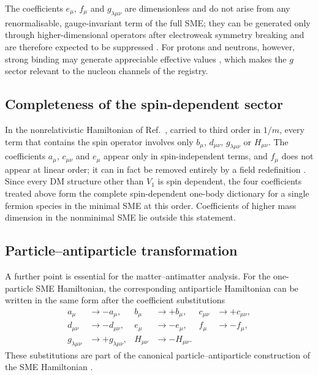 \documentclass[aps,prd,reprint,superscriptaddress,nofootinbib]{revtex4-2}
\begin{document}
The coefficients $e_\mu$, $f_\mu$ and $g_{\lambda\mu\nu}$ are
dimensionless and do not arise from any renormalisable, gauge-invariant
term of the full SME; they can be generated only through
higher-dimensional operators after electroweak symmetry breaking and are
therefore expected to be suppressed \cite{ColladayKostelecky1998}. For
protons and neutrons, however, strong binding may generate appreciable
effective values \cite{KosteleckyLane1999a}, which makes the $g$ sector
relevant to the nucleon channels of the registry.

\subsection{Completeness of the spin-dependent sector}
\label{sec:completeness}

In the nonrelativistic Hamiltonian of Ref.~\cite{KosteleckyLane1999},
carried to third order in $1/m$, every term that contains the spin
operator involves only $b_\mu$, $d_{\mu\nu}$, $g_{\lambda\mu\nu}$ or
$H_{\mu\nu}$. The coefficients $a_\mu$, $c_{\mu\nu}$ and $e_\mu$ appear
only in spin-independent terms, and $f_\mu$ does not appear at linear
order; it can in fact be removed entirely by a field redefinition
\cite{Altschul2006}. Since every DM structure other than $V_1$ is
spin dependent, the four coefficients treated above form the complete
spin-dependent one-body dictionary for a single fermion species in the
minimal SME at this order. Coefficients of higher mass dimension in the
nonminimal SME lie outside this statement.

\subsection{Particle--antiparticle transformation}
	
	A further point is essential for the matter--antimatter analysis.
	For the one-particle SME Hamiltonian, the corresponding antiparticle
	Hamiltonian can be written in the same form after the coefficient
	substitutions
	\begin{equation}
		\begin{aligned}
			a_\mu&\rightarrow -a_\mu,
			&
			b_\mu&\rightarrow +b_\mu,
			&
			c_{\mu\nu}&\rightarrow +c_{\mu\nu},
			\\
			d_{\mu\nu}&\rightarrow -d_{\mu\nu},
			&
			e_\mu&\rightarrow -e_\mu,
			&
			f_\mu&\rightarrow -f_\mu,
			\\
			g_{\lambda\mu\nu}&\rightarrow +g_{\lambda\mu\nu},
			&
			H_{\mu\nu}&\rightarrow -H_{\mu\nu}.
		\end{aligned}
		\label{eq:antiparticleSME}
	\end{equation}
	These substitutions are part of the canonical particle--antiparticle
	construction of the SME Hamiltonian \cite{KosteleckyLane1999}.
	
\end{document}
